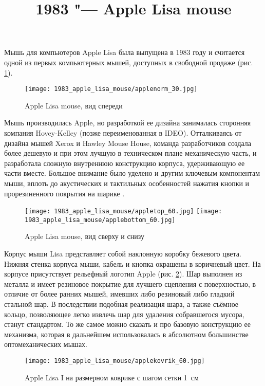 \documentclass[11pt, a4paper]{article}
\begin{document}
\title{1983 "--- Apple Lisa mouse}
\date{}
\maketitle
{}
Мышь для компьютеров Apple Lisa была выпущена в 1983 году \cite{mouses} и считается одной из первых компьютерных мышей, доступных в свободной продаже (рис. \ref{fig:AppleLisaPic}).

\begin{figure}[h]
   \centering
    \texttt{[image: 1983\_apple\_lisa\_mouse/applenorm\_30.jpg]}
    \caption{Apple Lisa mouse, вид спереди}
    \label{fig:AppleLisaPic}
\end{figure}

Мышь производилась Apple, но разработкой ее дизайна занималась сторонняя компания Hovey-Kelley (позже переименованная в IDEO). Отталкиваясь от дизайна мышей Xerox и Hawley Mouse House, команда разработчиков создала более дешевую и при этом лучшую в техническом плане механическую часть, и разработала сложную внутреннюю конструкцию корпуса, удерживающую ее части вместе. Большое внимание было уделено и другим ключевым компонентам мыши, вплоть до акустических и тактильных особенностей нажатия кнопки и прорезиненного покрытия на шарике \cite{ideo}.

\begin{figure}[h]
    \centering
    \texttt{[image: 1983\_apple\_lisa\_mouse/appletop\_60.jpg]}
    \texttt{[image: 1983\_apple\_lisa\_mouse/applebottom\_60.jpg]}
    \caption{Apple Lisa mouse, вид сверху и снизу}
    \label{fig:AppleLisaTopAndBottom}
\end{figure}

Корпус мыши Lisa представляет собой наклонную коробку бежевого цвета. Нижняя стенка корпуса мыши, кабель и кнопка окрашены в коричневый цвет. На корпусе присутствует рельефный логотип Apple (рис. \ref{fig:AppleLisaTopAndBottom}). Шар выполнен из металла и имеет резиновое покрытие для лучшего сцепления с поверхностью, в отличие от более ранних мышей, имевших либо резиновый либо гладкий стальной шар. В последствии подобная реализация шара, а также съёмное кольцо, позволяющее легко извлечь шар для удаления собравшегося мусора, станут стандартом. То же самое можно сказать и про базовую конструкцию ее механизма, которая в дальнейшем использовалась в абсолютном большинстве оптомеханических мышах.

\begin{figure}[h]
    \centering
    \texttt{[image: 1983\_apple\_lisa\_mouse/applekovrik\_60.jpg]}
    \caption{Apple Lisa I на размерном коврике с шагом сетки 1~см}
    \label{fig:AppleLisaSize}
\end{figure}
\end{document}
